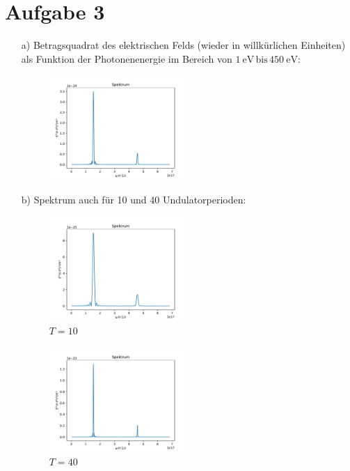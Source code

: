 \documentclass[11pt,a4paper]{article}
\begin{document}
    \section*{Aufgabe 3}
		\begin{itemize}
			\item[a)] Betragsquadrat des elektrischen Felds (wieder in willkürlichen Einheiten) als Funktion der Photonenenergie 
			im Bereich von $\SI{1}{\electronvolt} \, \text{bis} \, \SI{450}{\electronvolt}$:
			\begin{figure}[H]
				\centering
				\includegraphics[width=0.5\textwidth]{build/spektrum_K1.5_Perioden20_neu.pdf}
			\end{figure}

			\item[b)] Spektrum auch für 10 und 40 Undulatorperioden:

			\begin{figure}[H]
				\centering
				\includegraphics[width=0.5\textwidth]{build/spektrum_K1.5_Perioden10_neu.pdf}
				\caption{$T = 10$}
			\end{figure}

			\begin{figure}[H]
				\centering
				\includegraphics[width=0.5\textwidth]{build/spektrum_K1.5_Perioden40_neu.pdf}
				\caption{$T = 40$}
			\end{figure}


\end{itemize}
\end{document}
